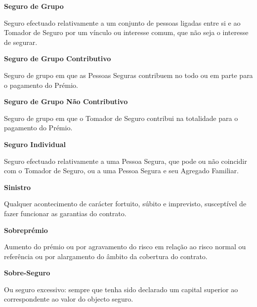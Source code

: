 \begin{description}
\item \textbf{Seguro de Grupo}

Seguro efectuado relativamente a um conjunto de pessoas ligadas entre si e ao Tomador de Seguro por um vínculo ou interesse comum, que não seja o interesse de segurar.
\end{description}

\begin{description}
\item \textbf{Seguro de Grupo Contributivo}

Seguro de grupo em que as Pessoas Seguras contribuem no todo ou em parte para o pagamento do Prémio.
\end{description}

\begin{description}
\item \textbf{Seguro de Grupo Não Contributivo}

Seguro de grupo em que o Tomador de Seguro contribui na totalidade para o pagamento do Prémio.
\end{description}

\begin{description}
\item \textbf{Seguro Individual}

Seguro efectuado relativamente a uma Pessoa Segura, que pode ou não coincidir com o Tomador de Seguro, ou a uma Pessoa Segura e seu Agregado Familiar.
\end{description}

\begin{description}
\item \textbf{Sinistro}

Qualquer acontecimento de carácter fortuito, súbito e imprevisto, susceptível de fazer funcionar as garantias do contrato.
\end{description}

\begin{description}
\item \textbf{Sobreprémio}

Aumento do prémio ou por agravamento do risco em relação ao risco normal ou referência ou por alargamento do âmbito da cobertura do contrato.
\end{description}

\begin{description}
\item \textbf{Sobre-Seguro}

Ou seguro excessivo: sempre que tenha sido declarado um capital superior ao correspondente ao valor do objecto seguro.
\end{description}

